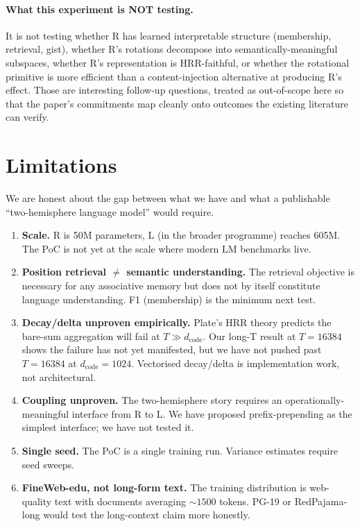\documentclass[10pt, twocolumn, a4paper]{article}
\begin{document}
\paragraph{What this experiment is NOT testing.} It is not testing whether R has learned interpretable structure (membership, retrieval, gist), whether R's rotations decompose into semantically-meaningful subspaces, whether R's representation is HRR-faithful, or whether the rotational primitive is more efficient than a content-injection alternative at producing R's effect. Those are interesting follow-up questions, treated as out-of-scope here so that the paper's commitments map cleanly onto outcomes the existing literature can verify.


\section{Limitations}
\label{sec:limitations}

We are honest about the gap between what we have and what a publishable ``two-hemisphere language model'' would require.

\begin{enumerate}[nosep,leftmargin=*]
\item \textbf{Scale.} R is 50M parameters, L (in the broader programme) reaches 605M. The PoC is not yet at the scale where modern LM benchmarks live.
\item \textbf{Position retrieval $\neq$ semantic understanding.} The retrieval objective is necessary for any associative memory but does not by itself constitute language understanding. F1 (membership) is the minimum next test.
\item \textbf{Decay/delta unproven empirically.} Plate's HRR theory predicts the bare-sum aggregation will fail at $T \gg d_{\text{code}}$. Our long-T result at $T=16384$ shows the failure has not yet manifested, but we have not pushed past $T=16384$ at $d_{\text{code}}=1024$. Vectorised decay/delta is implementation work, not architectural.
\item \textbf{Coupling unproven.} The two-hemisphere story requires an operationally-meaningful interface from R to L. We have proposed prefix-prepending as the simplest interface; we have not tested it.
\item \textbf{Single seed.} The PoC is a single training run. Variance estimates require seed sweeps.
\item \textbf{FineWeb-edu, not long-form text.} The training distribution is web-quality text with documents averaging $\sim 1500$ tokens. PG-19 or RedPajama-long would test the long-context claim more honestly.
\end{enumerate}
\end{document}
